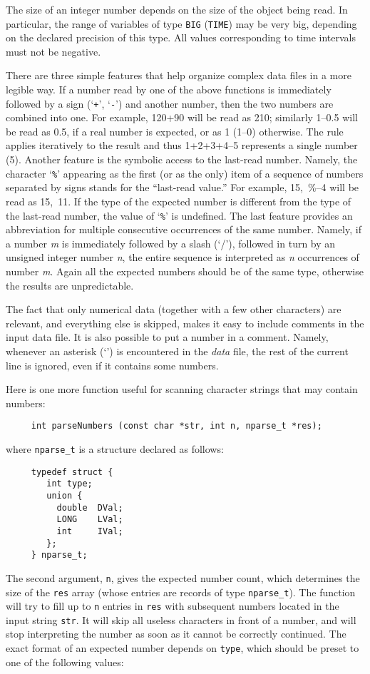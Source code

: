 The size of an integer number depends on the size of the
object being read.
In particular, the range of variables of type
{\tt BIG} ({\tt TIME}) may be very big,
depending on the declared precision of this type.
All values corresponding to time intervals must not be negative.

There are three simple features that help organize complex
data files in a more legible way.
If a number read by one of the above functions is immediately
followed by a sign (`{\tt +}', `{\tt -}')
and another number, then the two numbers are
combined into one. For example, 120+90 will be read as 210; similarly
1--0.5 will be read as 0.5, if a real number is expected, or as 1 (1--0)
otherwise. The rule applies iteratively to the result and thus 1+2+3+4--5
represents a single number (5). Another feature is the symbolic access to
the last-read number. Namely, the character `{\tt \%}'
appearing as the first (or as the
only) item of a sequence of numbers separated by signs stands for
the ``last-read value.''
For example, 15,~\%--4 will be read as 15,~11.
If the type of the expected number
is different from the type of the last-read number, the value of `{\tt \%}' is
undefined.
The last feature provides an
abbreviation for multiple consecutive occurrences of the same number.
Namely, if a number {\em m\/}
is immediately followed by a slash (`/'), followed in
turn by an unsigned integer number {\em n}, the entire sequence is interpreted as
{\em n\/} occurrences of number {\em m}.
Again all the expected numbers should be of the
same type, otherwise the results are unpredictable.

The fact that only numerical data (together with a few other characters)
are relevant,
and everything else is skipped, makes it easy to include comments in the
input data file.
It is also possible to put a number in a comment.
Namely,
whenever an asterisk (`{\tt *}') is encountered in the {\em data\/} file,
the rest of the current line is ignored, even if
it contains some numbers.

Here is one more function useful for scanning character strings that may
contain numbers:
\begin{verbatim}
     int parseNumbers (const char *str, int n, nparse_t *res);
\end{verbatim}
\noindent
where {\tt nparse\_t} is a structure declared as follows:
\begin{verbatim}
     typedef struct {
        int type;
        union {
          double  DVal;
          LONG    LVal;
          int     IVal;
        };
     } nparse_t;
\end{verbatim}
The second argument, {\tt n}, gives the expected number count, which
determines the size of the {\tt res} array (whose entries are records of
type {\tt nparse\_t}).
The function will try to fill up to {\tt n} entries in {\tt res} with
subsequent numbers located in the input string {\tt str}.
It will skip all useless characters in front of a number, and will stop
interpreting the number as soon as it cannot be correctly continued.
The exact format of an expected number depends on {\tt type}, which should
be preset to one of the following values:


